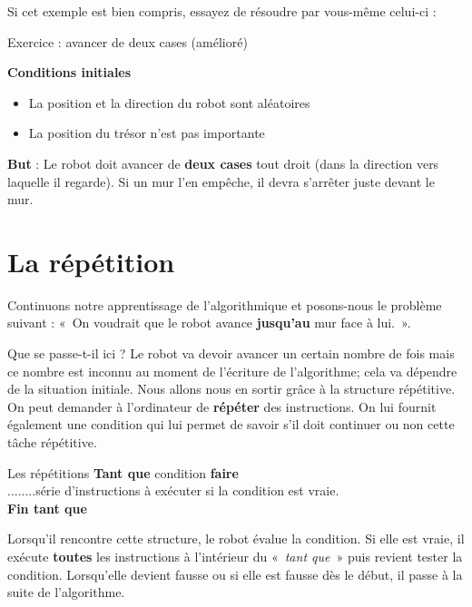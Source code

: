 	Si cet exemple est bien compris, 
	essayez de résoudre par vous-même celui-ci :

	\begin{Emphase}{Exercice : avancer de deux cases (amélioré)}

		\textbf{Conditions initiales}

		\begin{itemize}
		\item La position et la direction du robot sont aléatoires
		\item La position du trésor n'est pas importante
		\end{itemize}
		
		\textbf{But} : Le robot doit avancer de \textbf{deux cases} tout droit
		(dans la direction vers laquelle il regarde). Si un mur
		l'en empêche, il devra s'arrêter
		juste devant le mur.

	\end{Emphase}

\section{La répétition}

	Continuons notre apprentissage de l'algorithmique et
	posons-nous le problème suivant : «~On voudrait que le robot avance
	\textbf{jusqu'au} mur face à lui.~».
	
	Que se passe-t-il ici ? Le robot va devoir avancer un certain nombre de
	fois mais ce nombre est inconnu au moment de
	l'écriture de l'algorithme; cela va
	dépendre de la situation initiale. Nous allons nous en sortir grâce à
	la structure répétitive. On peut demander à
	l'ordinateur de \textbf{répéter} des instructions. On
	lui fournit également une condition qui lui permet de savoir
	s'il doit continuer ou non cette tâche répétitive.

	\begin{Emphase}{Les répétitions}
		{\sffamily\bfseries Tant que} condition {\sffamily\bfseries faire}
		\\{\color{white}........}série d'instructions à exécuter si la condition est vraie.
		\\{\sffamily\bfseries Fin tant que}
	\end{Emphase}

	Lorsqu'il rencontre cette structure, le robot évalue la
	condition. Si elle est vraie, il exécute \textbf{toutes} les
	instructions à l'intérieur du «~\textit{tant que~}»
	puis revient tester la condition. Lorsqu'elle devient
	fausse ou si elle est fausse dès le début, il passe à la suite de
	l'algorithme.
	
